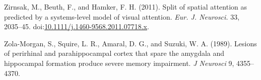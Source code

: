 \documentclass[
  11pt,
  a4paper,
]{scrbook}
\newlength{\cslhangindent}
\newenvironment{CSLReferences}[2] %
 {\begin{list}{}{%
  \setlength{\itemindent}{0pt}
  \setlength{\leftmargin}{0pt}
  \setlength{\parsep}{0pt}
  \ifodd #1
   \setlength{\leftmargin}{\cslhangindent}
   \setlength{\itemindent}{-1\cslhangindent}
  \fi
  \setlength{\itemsep}{#2\baselineskip}}}
 {\end{list}}
\begin{document}
\begin{CSLReferences}{1}{1}
Zirnsak, M., Beuth, F., and Hamker, F. H. (2011). {Split of spatial
attention as predicted by a systems-level model of visual attention.}
\emph{Eur. J. Neurosci.} 33, 2035--45.
doi:\href{https://doi.org/10.1111/j.1460-9568.2011.07718.x}{10.1111/j.1460-9568.2011.07718.x}.

Zola-Morgan, S., Squire, L. R., Amaral, D. G., and Suzuki, W. A. (1989).
Lesions of perirhinal and parahippocampal cortex that spare the amygdala
and hippocampal formation produce severe memory impairment. \emph{J
Neurosci} 9, 4355--4370.

\end{CSLReferences}


\backmatter
\end{document}

